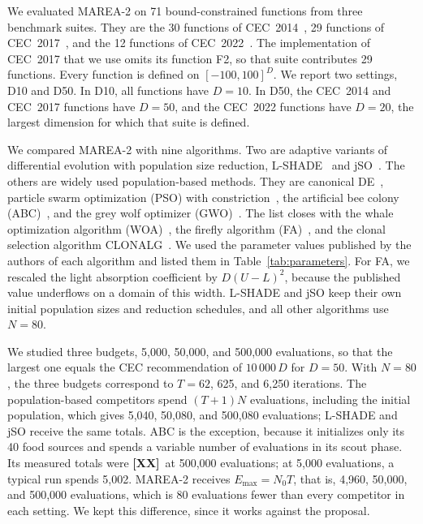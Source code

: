\documentclass[preprint,12pt]{elsarticle}
\newcommand{\XX}{\textcolor{pending}{\textbf{[XX]}}}
\newcommand{\pend}[1]{\textcolor{pending}{#1}}
\newcommand{\XX}{[XX]}
\newcommand{\pend}[1]{#1}
\begin{document}
We evaluated MAREA-2 on 71 bound-constrained functions from three benchmark
suites. They are the 30 functions of CEC~2014~\cite{liang2013cec2014}, 29
functions of CEC~2017~\cite{awad2016cec2017}, and the 12 functions of
CEC~2022~\cite{kumar2021cec2022}. The implementation of CEC~2017 that we use
omits its function F2, so that suite contributes 29 functions. %
Every function is defined on $[-100, 100]^D$. We report two settings, D10 and
D50. In D10, all functions have $D = 10$. In D50, the CEC~2014 and CEC~2017
functions have $D = 50$, and the CEC~2022 functions have $D = 20$, the largest
dimension for which that suite is defined.

We compared MAREA-2 with nine algorithms. Two are adaptive variants of differential evolution with population size
reduction, L-SHADE~\cite{tanabe2014lshade} and jSO~\cite{brest2017jso}. The others are widely used population-based methods. They are canonical DE~\cite{storn1997de}, particle swarm optimization (PSO)
with constriction~\cite{clerc2002pso}, the artificial bee colony
(ABC)~\cite{karaboga2007abc}, and the grey wolf optimizer
(GWO)~\cite{mirjalili2014gwo}. The list closes with the whale optimization
algorithm (WOA)~\cite{mirjalili2016woa}, the firefly algorithm
(FA)~\cite{yang2009firefly}, and the clonal selection algorithm
CLONALG~\cite{decastro2002clonalg}. We used the
parameter values published by the authors of each algorithm and listed them in
Table~\ref{tab:parameters}. For FA, we rescaled the light absorption
coefficient by $D(U - L)^2$, because the published value underflows on a
domain of this width. L-SHADE and jSO keep their own initial population sizes and reduction
schedules, and all other algorithms use $N = 80$.



We studied three budgets, 5,000, 50,000, and 500,000 evaluations, so that the
largest one equals the CEC recommendation of $10\,000\,D$ for $D = 50$. With
$N = 80$, the three budgets correspond to $T = 62$, 625, and 6,250
iterations. The population-based competitors spend $(T + 1)N$ evaluations,
including the initial population, which gives 5,040, 50,080, and 500,080
evaluations; L-SHADE and jSO receive the same totals. ABC is the exception,
because it initializes only its 40 food sources and spends a variable number of
evaluations in its scout phase. \pend{Its measured totals were \XX\ at
500,000 evaluations; at 5,000 evaluations, a typical run spends 5,002.} MAREA-2 receives
$E_{\max} = N_0 T$, that is, 4,960, 50,000, and 500,000 evaluations, which is
80 evaluations fewer than every competitor in each setting. We kept this
difference, since it works against the proposal.
\end{document}
